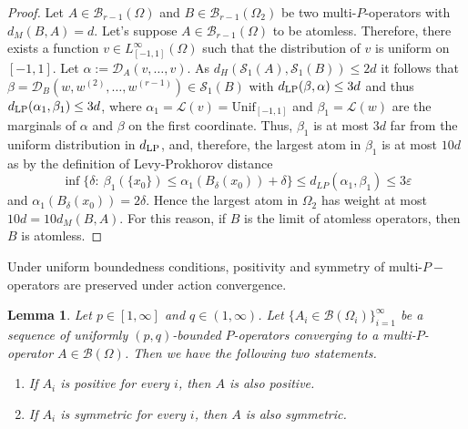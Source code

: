 \documentclass[11pt]{article}
\newtheorem{lemma}[theorem]{Lemma}
\begin{document}
\begin{proof} %
Let $A\in\mathcal{B}_{r-1}(\Omega)$ and $B\in\mathcal{B}_{r-1}(\Omega_2)$ be two multi-$P$-operators with $d_M(B,A)=d$. Let's suppose $A\in\mathcal{B}_{r-1}(\Omega)$ to be atomless. Therefore, there exists a function $v\in L^{\infty}_{[-1,1]}(\Omega)$ such that the distribution of $v$ is uniform on $[-1,1]$. Let $\alpha:=\mathcal{D}_A(v,\ldots,v)$.  As $d_H(\mathcal{S}_1(A),\mathcal{S}_1(B))\leq 2d$ it follows that $\beta=\mathcal{D}_B(w,w^{(2)},\ldots,w^{(r-1)})\in\mathcal{S}_1(B)$ with $d_{\rm LP}(\beta,\alpha)\leq 3d$ and thus $d_{\rm LP}(\alpha_1,\beta_1)\leq3d$, where $\alpha_1=\mathcal{L}(v)=\text{Unif}_{[-1,1]}$ and $\beta_1=\mathcal{L}(w)$ are the marginals of $\alpha$ and $\beta$ on the first coordinate. Thus, $\beta_1$ is at most $3d$ far from the uniform distribution in $d_{\rm LP}$, and, therefore, the largest atom in $\beta_1$ is at most $10d$ as by the definition of Levy-Prokhorov distance
$$
\inf\{\delta:\ \beta_1(\{x_0\})\leq \alpha_1(B_{\delta}(x_0))+\delta\}\leq d_{LP}(\alpha_1,\beta_1)\leq 3\varepsilon
$$
and $\alpha_1(B_{\delta}(x_0))=2\delta$. Hence the largest atom in $\Omega_2$ has weight at most $10d=10d_M(B,A)$. For this reason, if $B$ is the limit of atomless operators, then $B$ is atomless. 
\end{proof}

Under uniform boundedness conditions, positivity and symmetry of multi-$P-$operators are preserved under action convergence.

\begin{lemma} \label{LemmaClosedSymmetric}Let $p\in[1,\infty]$ and $q\in (1,\infty)$. Let $\{A_i\in\mathcal{B}(\Omega_i)\}_{i=1}^\infty$ be a sequence of uniformly $(p,q)$-bounded  $P$-operators converging to a multi-$P$-operator $A\in\mathcal{B}(\Omega)$. Then we have the following two statements.
\begin{enumerate}
\item If $A_i$ is positive for every $i$, then $A$ is also positive.
\item If $A_i$ is symmetric for every $i$, then $A$ is also symmetric.
\end{enumerate}
\end{lemma}
\end{document}
